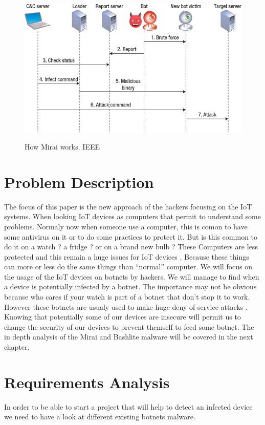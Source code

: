 \documentclass{report}
\begin{document}
\newpage
\begin{figure}[h]
 \caption{How Mirai works. IEEE \protect\footnotemark}
 \centering
 \includegraphics[width=1.2\textwidth]{./img/botnet-fonct}
 \label{fig:botnet-fonct}
\end{figure}


\chapter{Problem Description}
The focus of this paper is the new approach of the hackers focusing on the IoT systems. When looking IoT devices as computers that permit to understand some problems. Normaly now when someone use a computer, this is comon to have some antivirus on it or to do some practices to protect it. But is this common to do it on a watch ? a fridge ? or on a brand new bulb ? These Computers are less protected and this remain a huge issues for IoT devices \autocite{yang2017survey}. Because these things can more or less do the same things than ``normal'' computer. We will focus on the usage of the IoT devices on botnets by hackers. We will manage to find when a device is potentially infected by a botnet. The importance may not be obvious because who cares if your watch is part of a botnet that don't stop it to work. However these botnets are usualy used to make huge deny of service attacks \autocite{hallman2017ioddos}. Knowing that potentially some of our devices are insecure will permit us to change the security of our devices to prevent themself to feed some botnet.\newline
The in depth analysis of the Mirai and Bashlite malware will be covered in the next chapter.

\chapter{Requirements Analysis}
In order to be able to start a project that will help to detect an infected device we need to have a look at different existing botnets malware.
\end{document}
